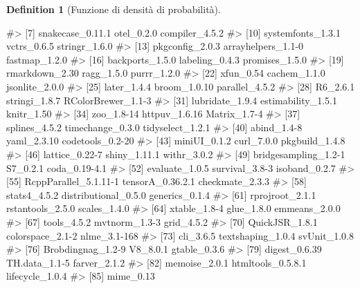 \documentclass[
  letterpaper,
  DIV=11,
  numbers=noendperiod,
  oneside]{scrreprt}
\newenvironment{Shaded}{\begin{snugshade}}{\end{snugshade}}
\newcommand{\CommentTok}[1]{\textcolor[rgb]{0.37,0.37,0.37}{#1}}
\theoremstyle{definition}
\theoremstyle{plain}
\theoremstyle{definition}
\newtheorem{definition}{Definition}[chapter]
\theoremstyle{remark}
\begin{document}
\begin{definition}[Funzione di densità di
probabilità]
\begin{tcolorbox}
\begin{Shaded}
\begin{Highlighting}[]
\CommentTok{\#\textgreater{}  [7] snakecase\_0.11.1      otel\_0.2.0            compiler\_4.5.2       }
\CommentTok{\#\textgreater{} [10] systemfonts\_1.3.1     vctrs\_0.6.5           stringr\_1.6.0        }
\CommentTok{\#\textgreater{} [13] pkgconfig\_2.0.3       arrayhelpers\_1.1{-}0    fastmap\_1.2.0        }
\CommentTok{\#\textgreater{} [16] backports\_1.5.0       labeling\_0.4.3        promises\_1.5.0       }
\CommentTok{\#\textgreater{} [19] rmarkdown\_2.30        ragg\_1.5.0            purrr\_1.2.0          }
\CommentTok{\#\textgreater{} [22] xfun\_0.54             cachem\_1.1.0          jsonlite\_2.0.0       }
\CommentTok{\#\textgreater{} [25] later\_1.4.4           broom\_1.0.10          parallel\_4.5.2       }
\CommentTok{\#\textgreater{} [28] R6\_2.6.1              stringi\_1.8.7         RColorBrewer\_1.1{-}3   }
\CommentTok{\#\textgreater{} [31] lubridate\_1.9.4       estimability\_1.5.1    knitr\_1.50           }
\CommentTok{\#\textgreater{} [34] zoo\_1.8{-}14            httpuv\_1.6.16         Matrix\_1.7{-}4         }
\CommentTok{\#\textgreater{} [37] splines\_4.5.2         timechange\_0.3.0      tidyselect\_1.2.1     }
\CommentTok{\#\textgreater{} [40] abind\_1.4{-}8           yaml\_2.3.10           codetools\_0.2{-}20     }
\CommentTok{\#\textgreater{} [43] miniUI\_0.1.2          curl\_7.0.0            pkgbuild\_1.4.8       }
\CommentTok{\#\textgreater{} [46] lattice\_0.22{-}7        shiny\_1.11.1          withr\_3.0.2          }
\CommentTok{\#\textgreater{} [49] bridgesampling\_1.2{-}1  S7\_0.2.1              coda\_0.19{-}4.1        }
\CommentTok{\#\textgreater{} [52] evaluate\_1.0.5        survival\_3.8{-}3        isoband\_0.2.7        }
\CommentTok{\#\textgreater{} [55] RcppParallel\_5.1.11{-}1 tensorA\_0.36.2.1      checkmate\_2.3.3      }
\CommentTok{\#\textgreater{} [58] stats4\_4.5.2          distributional\_0.5.0  generics\_0.1.4       }
\CommentTok{\#\textgreater{} [61] rprojroot\_2.1.1       rstantools\_2.5.0      scales\_1.4.0         }
\CommentTok{\#\textgreater{} [64] xtable\_1.8{-}4          glue\_1.8.0            emmeans\_2.0.0        }
\CommentTok{\#\textgreater{} [67] tools\_4.5.2           mvtnorm\_1.3{-}3         grid\_4.5.2           }
\CommentTok{\#\textgreater{} [70] QuickJSR\_1.8.1        colorspace\_2.1{-}2      nlme\_3.1{-}168         }
\CommentTok{\#\textgreater{} [73] cli\_3.6.5             textshaping\_1.0.4     svUnit\_1.0.8         }
\CommentTok{\#\textgreater{} [76] Brobdingnag\_1.2{-}9     V8\_8.0.1              gtable\_0.3.6         }
\CommentTok{\#\textgreater{} [79] digest\_0.6.39         TH.data\_1.1{-}5         farver\_2.1.2         }
\CommentTok{\#\textgreater{} [82] memoise\_2.0.1         htmltools\_0.5.8.1     lifecycle\_1.0.4      }
\CommentTok{\#\textgreater{} [85] mime\_0.13}
\end{Highlighting}
\end{Shaded}


\end{tcolorbox}
\end{definition}
\end{document}
